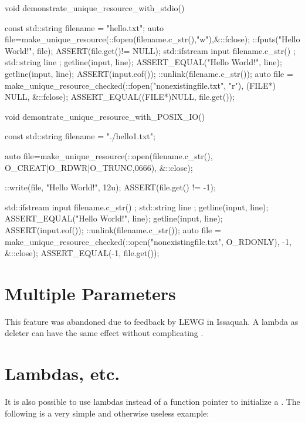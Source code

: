\documentclass[ebook,11pt,article]{memoir}
\begin{document}
\begin{codeblock}
void demonstrate_unique_resource_with_stdio() {
	const std::string filename = "hello.txt";
	{
		auto file=make_unique_resource(::fopen(filename.c_str(),"w"),&::fclose);
		::fputs("Hello World!\n", file);
		ASSERT(file.get()!= NULL);
	}
	{
		std::ifstream input { filename.c_str() };
		std::string line { };
		getline(input, line);
		ASSERT_EQUAL("Hello World!", line);
		getline(input, line);
		ASSERT(input.eof());
	}
	::unlink(filename.c_str());
	{
		auto file = make_unique_resource_checked(::fopen("nonexistingfile.txt", "r"), 
		            (FILE*) NULL, &::fclose);
		ASSERT_EQUAL((FILE*)NULL, file.get());
	}

}
\end{codeblock}

\newpage
\begin{codeblock}
void demontrate_unique_resource_with_POSIX_IO() {
	const std::string filename = "./hello1.txt";
	{
		auto file=make_unique_resource(::open(filename.c_str(),
                     O_CREAT|O_RDWR|O_TRUNC,0666), &::close);
		
		::write(file, "Hello World!\n", 12u);
		ASSERT(file.get() != -1);
	}
	{
		std::ifstream input { filename.c_str() };
		std::string line { };
		getline(input, line);
		ASSERT_EQUAL("Hello World!", line);
		getline(input, line);
		ASSERT(input.eof());
	}
	::unlink(filename.c_str());
	{
		auto file = make_unique_resource_checked(::open("nonexistingfile.txt", 
                       O_RDONLY), -1, &::close);
		ASSERT_EQUAL(-1, file.get());
	}

}\end{codeblock}
\newpage
\section{Multiple Parameters}
This feature was abandoned due to feedback by LEWG in Issaquah. A lambda as deleter can have the same effect without complicating .

\section{Lambdas, etc.}
It is also possible to use lambdas instead of a function pointer to initialize a .  The following is a very simple and otherwise useless example:
\end{document}
